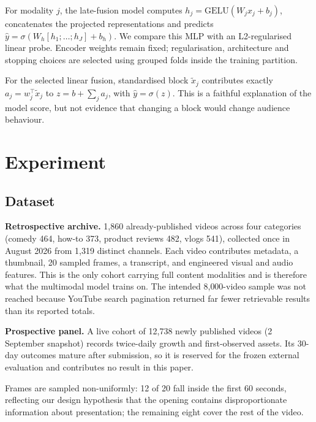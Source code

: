 \documentclass[letterpaper]{article}
\begin{document}
For modality $j$, the late-fusion model computes
$h_j=\mathrm{GELU}(W_jx_j+b_j)$, concatenates the projected representations and
predicts $\hat y=\sigma(W_h[h_1;\ldots;h_J]+b_h)$. We compare this MLP with an
L2-regularised linear probe. Encoder weights remain fixed; regularisation,
architecture and stopping choices are selected using grouped folds inside the
training partition.

For the selected linear fusion, standardised block $\tilde{x}_j$ contributes
exactly $a_j=w_j^\top\tilde{x}_j$ to
$z=b+\sum_j a_j$, with $\hat y=\sigma(z)$. This is a faithful explanation of
the model score, but not evidence that changing a block would change audience
behaviour.

\section{Experiment}


\subsection{Dataset}

\textbf{Retrospective archive.} 1{,}860 already-published videos across four
categories (comedy 464, how-to 373, product reviews 482, vlogs 541), collected
once in August 2026 from 1{,}319 distinct channels. Each video contributes
metadata, a thumbnail, 20 sampled frames, a transcript, and engineered visual and
audio features. This is the only cohort carrying full content modalities and is
therefore what the multimodal model trains on.
The intended 8{,}000-video sample was not reached because YouTube search
pagination returned far fewer retrievable results than its reported totals.

\textbf{Prospective panel.} A live cohort of 12{,}738 newly published videos
(2 September snapshot) records twice-daily growth and first-observed assets.
Its 30-day outcomes mature after submission, so it is reserved for the frozen
external evaluation and contributes no result in this paper.

Frames are sampled non-uniformly: 12 of 20 fall inside the first 60 seconds,
reflecting our design hypothesis that the opening contains disproportionate
information about presentation; the remaining eight cover the rest of the video.
\end{document}
